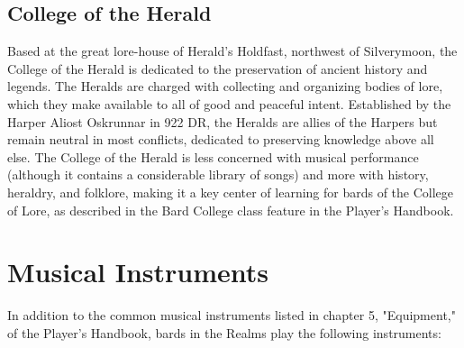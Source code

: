 \documentclass[10pt,a4paper,twoside,twocolumn,openany,bg=print,nodeprecatedcode]{dndbook}
\begin{document}
\subsection{College of the Herald}
Based at the great lore-house of Herald's Holdfast, northwest of Silverymoon, the College of the Herald is dedicated to the preservation of ancient history and legends. The Heralds are charged with collecting and organizing bodies of lore, which they make available to all of good and peaceful intent. Established by the Harper Aliost Oskrunnar in 922 DR, the Heralds are allies of the Harpers but remain neutral in most conflicts, dedicated to preserving knowledge above all else.
The College of the Herald is less concerned with musical performance (although it contains a considerable library of songs) and more with history, heraldry, and folklore, making it a key center of learning for bards of the College of Lore, as described in the Bard College class feature in the Player's Handbook.
\section{Musical Instruments}
In addition to the common musical instruments listed in chapter 5, "Equipment," of the Player's Handbook, bards in the Realms play the following instruments:
\end{document}
